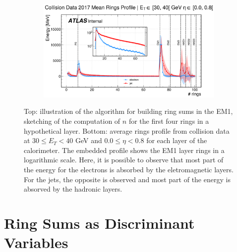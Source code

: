 \begin{figure}[!ht]
\begin{center}
  \begin{subfigure}[c]{.7\textwidth}
  \centering
  \includegraphics[width=1.1\textwidth]{sections/ringer/figures/reco_steps/data17_zee_mean_rings_profiles_et2_eta0.png}
  \caption{}
  \label{fig:building_rings_b}
  \end{subfigure}
  \caption{
  Top: illustration of the \fastcalo algorithm for building ring sums in the EM1, sketching of the computation of $n$ for the first four rings in a hypothetical layer.
  	Bottom: average rings profile from collision data at $30 \leq E_T < 40$ GeV and $0.0 \leq \eta < 0.8$ for each layer of the calorimeter. The embedded profile shows the EM1 layer rings in a logarithmic scale. Here, it is possible to observe that most part of the energy for the electrons is absorbed by the eletromagnetic layers. For the jets, the opposite is observed and most part of the energy is absorved by the hadronic layers.}
  \end{center}
\end{figure}





\section{Ring Sums as Discriminant Variables}\label{ssec:ringer_id}


